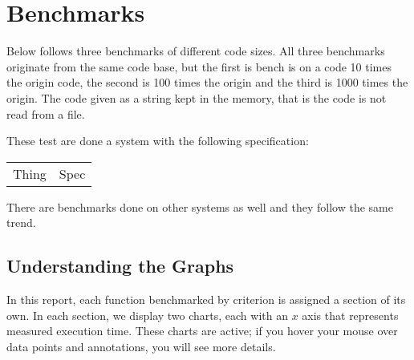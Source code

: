 
\chapter{Benchmarks} \label{preformanceAppendix}
Below follows three benchmarks of different code sizes. All three benchmarks 
originate from the same code base, but the first is bench is on a code 10 times
the origin code, the second is 100 times the origin and the third is 1000 times
the origin. The code given as a string kept in the memory, that is the code is
not read from a file.

These test are done a system with the following specification:
\begin{center}
\begin{tabular}{l l}
Thing & Spec
\end{tabular}
\end{center}
There are benchmarks done on other systems as well and they follow the same trend.





\section*{Understanding the Graphs}
In this report, each function benchmarked by criterion is assigned
a section of its own.  In each section, we display two charts, each
with an $x$ axis that represents measured execution time.
These charts are active; if you hover your mouse over data points
and annotations, you will see more details.

